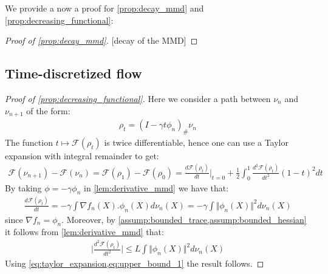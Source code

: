 We provide a now a proof for \cref{prop:decay_mmd} and \cref{prop:decreasing_functional}:

\begin{proof}[Proof of \cref{prop:decay_mmd}]\label{proof:prop:decay_mmd}[decay of the MMD]
\end{proof}




\subsection{Time-discretized flow}\label{appendix:subsec:convegence_time_discrete}

\begin{proof}[Proof of \cref{prop:decreasing_functional}]\label{proof:prop:decreasing_functional}
	Here we consider a path between $\nu_n$ and $\nu_{n+1}$ of the form:
	\begin{align*}
	\rho_t	=(I-\gamma t\phi_n)_{\#}\nu_n
	\end{align*}
	The function $t\mapsto \mathcal{F}(\rho_t)$ is twice differentiable, hence one can use a Taylor expansion with integral remainder to get:
	\begin{align}\label{eq:taylor_expansion}
	\mathcal{F}(\nu_{n+1})-\mathcal{F}(\nu_{n})=\mathcal{F}(\rho_1)-\mathcal{F}(\rho_0) = \frac{d \mathcal{F}(\rho_t) }{dt}\vert_{t=0}+ \frac{1}{2} \int_0^1 \frac{d^2 \mathcal{F}(\rho_t)}{dt^2}(1-t)^2 dt 
	\end{align} 
	By taking $\phi=-\gamma \phi_n$ in \cref{lem:derivative_mmd} we have that:
	\begin{align*}
	\frac{d \mathcal{F}(\rho_t) }{dt} = -\gamma \int \nabla f_n(X).\phi_n(X)d\nu_n(X)=-\gamma \int \Vert \phi_n(X) \Vert^2 d\nu_n(X)
	\end{align*}
	since $\nabla f_n=\phi_n$.
	Moreover, by \cref{assump:bounded_trace,assump:bounded_hessian} it follows from \cref{lem:derivative_mmd} that:
	\begin{align}\label{eq:upper_bound_1}
	\vert \frac{d^2 \mathcal{F}(\rho_t) }{dt^2}   \vert\leq L\int \Vert \phi_n(X) \Vert^2 d\nu_n(X)
	\end{align}
	Using \cref{eq:taylor_expansion,eq:upper_bound_1} the result follows.
\end{proof}


